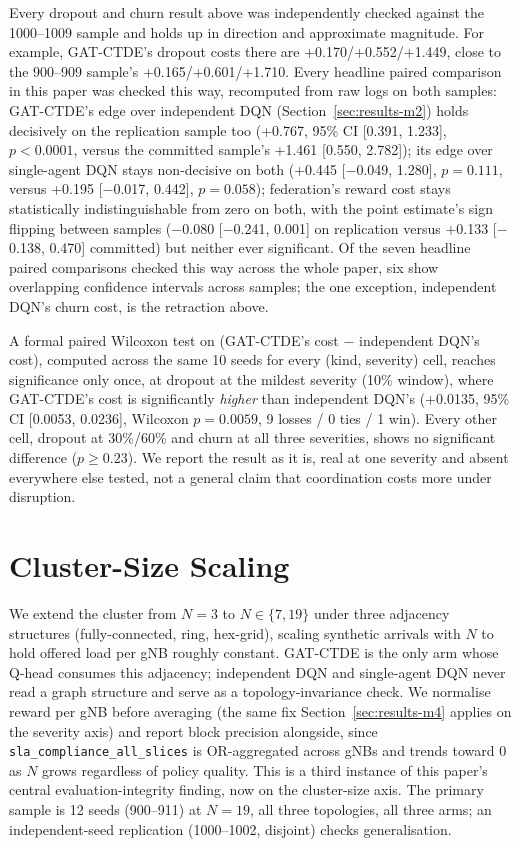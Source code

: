 \documentclass[pdflatex,sn-basic,Numbered]{sn-jnl}%
\begin{document}
Every dropout and churn result above was independently checked against the 1000--1009 sample and holds up in direction and approximate magnitude. For example, GAT-CTDE's dropout costs there are +0.170/+0.552/+1.449, close to the 900--909 sample's +0.165/+0.601/+1.710. Every headline paired comparison in this paper
was checked this way, recomputed from raw logs on both samples:
GAT-CTDE's edge over independent DQN (Section~\ref{sec:results-m2})
holds decisively on the replication sample too (+0.767, 95\% CI
[0.391, 1.233], $p<0.0001$, versus the committed sample's +1.461
[0.550, 2.782]); its edge over single-agent DQN stays non-decisive on
both (+0.445 [$-$0.049, 1.280], $p=0.111$, versus +0.195 [$-$0.017,
0.442], $p=0.058$); federation's reward cost stays statistically
indistinguishable from zero on both, with the point estimate's sign
flipping between samples ($-$0.080 [$-$0.241, 0.001] on replication
versus +0.133 [$-$0.138, 0.470] committed) but neither ever
significant. Of the seven headline paired comparisons checked this way across the whole paper, six show overlapping confidence intervals across samples; the one exception, independent DQN's churn cost, is the retraction above.

A formal paired Wilcoxon test on (GAT-CTDE's cost $-$ independent DQN's cost), computed across the same 10 seeds for every (kind, severity) cell, reaches significance only once, at dropout at the mildest severity (10\% window), where GAT-CTDE's cost is significantly \emph{higher} than independent DQN's (+0.0135, 95\% CI [0.0053, 0.0236], Wilcoxon $p=0.0059$, 9 losses / 0 ties / 1 win). Every other cell, dropout at 30\%/60\% and churn at all three severities, shows no significant difference ($p \geq 0.23$). We report the result as it is, real at one severity and absent everywhere else tested, not a general claim that coordination costs more under disruption.

\section{Cluster-Size Scaling}
\label{sec:results-m6}
We extend the cluster from $N=3$ to $N \in \{7, 19\}$ under three
adjacency structures (fully-connected, ring, hex-grid), scaling
synthetic arrivals with $N$ to hold offered load per gNB roughly
constant. GAT-CTDE is the only arm whose Q-head consumes this
adjacency; independent DQN and single-agent DQN never read a graph
structure and serve as a topology-invariance check. We normalise
reward per gNB before averaging (the same fix Section~\ref{sec:results-m4}
applies on the severity axis) and report block precision alongside,
since \texttt{sla\_compliance\_all\_slices} is OR-aggregated across gNBs and trends toward 0 as $N$ grows regardless of policy quality. This is a third instance of this paper's central evaluation-integrity finding, now on the cluster-size axis. The primary sample is 12 seeds
(900--911) at $N=19$, all three topologies, all three arms; an
independent-seed replication (1000--1002, disjoint) checks
generalisation.
\end{document}
